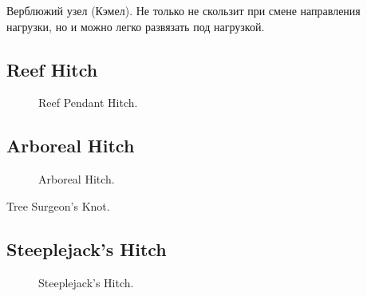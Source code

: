 Верблюжий узел (Кэмел). Не только не скользит при смене направления нагрузки, но и можно легко развязать под нагрузкой.

\subsection{Reef  Hitch}

\begin{figure}[H]\centering
	\begin{minipage}{1\linewidth}
		\begin{center}
			\tcbox[enhanced jigsaw,colframe=black,opacityframe=0.5,opacityback=0.5]
			{\centering{}}
		\end{center}
	\end{minipage}
\caption{Reef Pendant Hitch.}
\label{ris:Reef_Pendant_Hitch}
\end{figure}

\subsection{Arboreal Hitch}

\begin{figure}[H]\centering
	\begin{minipage}{1\linewidth}
		\begin{center}
			\tcbox[enhanced jigsaw,colframe=black,opacityframe=0.5,opacityback=0.5]
			{\centering{}}
		\end{center}
	\end{minipage}
\caption{Arboreal Hitch.}
\label{ris:Arboreal_Hitch}
\end{figure}

Tree Surgeon’s Knot.

\subsection{Steeplejack’s Hitch}

\begin{figure}[H]\centering
\hfil
	\caption{Steeplejack’s Hitch.}\label{ris:Steeplejacks_Hitch}
\end{figure}

